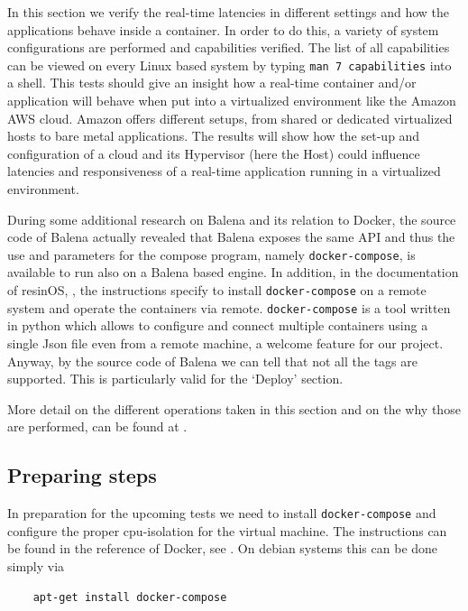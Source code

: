 \documentclass[]{scrartcl}
\begin{document}
In this section we verify the real-time latencies in different settings and how the applications behave inside a container. In order to do this, a variety of system configurations are performed and capabilities verified. The list of all capabilities can be viewed on every Linux based system by typing \texttt{man 7 capabilities} into a shell. This tests should give an insight how a real-time container and/or application will behave when put into a virtualized environment like the Amazon AWS cloud. Amazon offers different setups, from shared or dedicated virtualized hosts to bare metal applications. The results will show how the set-up and configuration of a cloud and its  Hypervisor (here the Host) could influence latencies and responsiveness of a real-time application running in a virtualized environment.

During some additional research on Balena and its relation to Docker, the source code of Balena actually revealed that Balena exposes the same API and thus the use and parameters for the compose program, namely \texttt{docker-compose}, is available to run also on a Balena based engine. In addition, in the documentation of resinOS, \cite{resin03}, the instructions specify to install \texttt{docker-compose} on a remote system and operate the containers via remote.
\texttt{docker-compose} is a tool written in python which allows to configure and connect multiple containers using a single Json file even from a remote machine, a welcome feature for our project.
Anyway, by the source code of Balena we can tell that not all the tags are supported. This is particularly valid for the `Deploy' section. 

More detail on the different operations taken in this section and on the why those are performed, can be found at \cite{lrt01}.

\subsection{Preparing steps}

In preparation for the upcoming tests we need to install \texttt{docker-compose} and configure the proper cpu-isolation for the virtual machine.
The instructions can be found in the reference of Docker, see \cite{docker05}. 
On debian systems this can be done simply via 

\begin{verbatim}
	apt-get install docker-compose
\end{verbatim}
\end{document}
